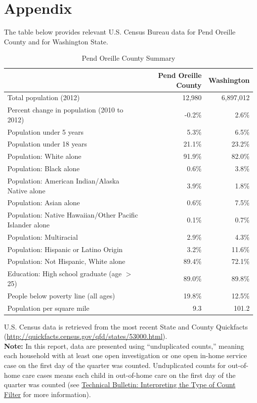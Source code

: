 \documentclass{article}\usepackage[]{graphicx}\usepackage[]{color}
\begin{document}
\vspace{-18pt}

\newpage

\section{Appendix}

The table below provides relevant U.S. Census Bureau data for Pend Oreille County and for Washington State. 
\nopagebreak[3]
\begin{table}[ht]
\centering
\caption{Pend Oreille County Summary} 
\begin{tabular}{lrr}
  \toprule
 & Pend Oreille County & Washington \\ 
  \midrule
Total population (2012) & 12,980 & 6,897,012 \\ 
  Percent change in population (2010 to 2012) & -0.2\% & 2.6\% \\ 
  Population under 5 years & 5.3\% & 6.5\% \\ 
  Population under 18 years & 21.1\% & 23.2\% \\ 
  Population: White alone & 91.9\% & 82.0\% \\ 
  Population: Black alone & 0.6\% & 3.8\% \\ 
  Population: American Indian/Alaska Native alone & 3.9\% & 1.8\% \\ 
  Population: Asian alone & 0.6\% & 7.5\% \\ 
  Population: Native Hawaiian/Other Pacific Islander alone & 0.1\% & 0.7\% \\ 
  Population: Multiracial & 2.9\% & 4.3\% \\ 
  Population: Hispanic or Latino Origin & 3.2\% & 11.6\% \\ 
  Population: Not Hispanic, White alone & 89.4\% & 72.1\% \\ 
  Education: High school graduate (age $>$25) & 89.0\% & 89.8\% \\ 
  People below poverty line (all ages) & 19.8\% & 12.5\% \\ 
  Population per square mile & 9.3 & 101.2 \\ 
   \bottomrule
\end{tabular}
\end{table}



U.S. Census data is retrieved from the most recent State and County Quickfacts (\href{http://quickfacts.census.gov/qfd/states/53000.html}{http://quickfacts.census.gov/qfd/states/53000.html}).\\

\textbf{Note:} In this report, data are presented using ``unduplicated counts,'' meaning each household with at least one open investigation or one open in-home service case on the first day of the quarter was counted. Unduplicated counts for out-of-home care cases means each child in out-of-home care on the first day of the quarter was counted (see \href{http://http://www.partnersforourchildren.org/publications/using-different-count-types-data-portal}{Technical Bulletin: Interpreting the Type of Count Filter} for more information).  
\end{document}
